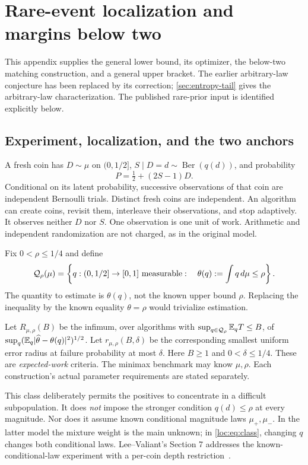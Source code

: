 \section{Rare-event localization and margins below two}\label{app:localization}
This appendix supplies the general lower bound, its optimizer, the
below-two matching construction, and a general upper bracket.
The earlier arbitrary-law conjecture has been replaced by its correction;
\cref{sec:entropy-tail} gives the arbitrary-law characterization.
The published rare-prior input is identified explicitly below.

\subsection{Experiment, localization, and the two anchors}
A fresh coin has $D\sim\mu$ on $(0,1/2]$, $S\mid D=d\sim\operatorname{Ber}(q(d))$, and probability
\[
 P=\tfrac12+(2S-1)D.
\]
Conditional on its latent probability, successive observations of that coin are independent Bernoulli trials. Distinct fresh coins are independent. An algorithm can create coins, revisit them, interleave their observations, and stop adaptively. It observes neither $D$ nor $S$. One observation is one unit of work. Arithmetic and independent randomization are not charged, as in the original model.

Fix $0<\rho\le1/4$ and define
\begin{equation}\label{loc:eq:class}
 \mathcal Q_\rho(\mu)=\left\{q:(0,1/2]\to[0,1]\text{ measurable}:\quad
 \theta(q):=\int q\,d\mu\le\rho\right\}.
\end{equation}
The quantity to estimate is $\theta(q)$, not the known upper bound $\rho$. Replacing the inequality by the known equality $\theta=\rho$ would trivialize estimation.

Let $R_{\mu,\rho}(B)$ be the infimum, over algorithms with $\sup_{q\in\mathcal Q_\rho}\mathbb E_qT\le B$, of $\sup_q(\mathbb E_q|\widehat\theta-\theta(q)|^2)^{1/2}$. Let $r_{\mu,\rho}(B,\delta)$ be the corresponding smallest uniform error radius at failure probability at most $\delta$. Here $B\ge1$ and $0<\delta\le1/4$. These are \emph{expected-work} criteria. The minimax benchmark may know $\mu,\rho$. Each construction's actual parameter requirements are stated separately.

This class deliberately permits the positives to concentrate in a difficult subpopulation. It does \emph{not} impose the stronger condition $q(d)\le\rho$ at every magnitude. Nor does it assume known conditional magnitude laws $\mu_+,\mu_-$. In the latter model the mixture weight is the main unknown; in \eqref{loc:eq:class}, changing $q$ changes both conditional laws. Lee--Valiant's Section 7 addresses the known-conditional-law experiment with a per-coin depth restriction~\cite{leevaliant}.

